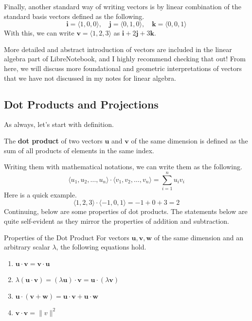 \documentclass[../../main.tex]{subfiles}
\begin{document}
Finally, another standard way of writing vectors is by linear
combination of the standard basis vectors defined as the following.
\[
\mathbf{i} = \langle 1, 0, 0 \rangle, \quad
\mathbf{j} = \langle 0, 1, 0 \rangle, \quad
\mathbf{k} = \langle 0, 0, 1 \rangle
\]
With this, we can write $\mathbf{v} = \langle 1, 2, 3 \rangle$ as
$\mathbf{i} + 2\mathbf{j} + 3\mathbf{k}$.

More detailed and abstract introduction of vectors are included
in the linear algebra part of LibreNotebook, and I highly recommend
checking that out! From here, we will discuss more foundational and
geometric interpretations of vectors that we have not discussed
in my notes for linear algebra.

\subsection{Dot Products and Projections}

As always, let's start with definition.

\begin{definition}{}{}
The \textbf{dot product} of two vectors $\mathbf{u}$ and $\mathbf{v}$
of the same dimension is defined as the sum of all products of
elements in the same index.
\end{definition}

Writing them with mathematical notations, we can write them as the
following.
\[
\langle u_1, u_2, \ldots, u_n \rangle \cdot
    \langle v_1, v_2, \ldots, v_n \rangle
= \sum_{i=1}^n u_i v_i
\]
Here is a quick example.
\[
\langle 1, 2, 3 \rangle \cdot \langle -1, 0, 1 \rangle
= -1 + 0 + 3
= 2
\]
Continuing, below are some properties of dot products. The statements
below are quite self-evident as they mirror the properties of addition
and subtraction.

\begin{theorem}{}{Properties of the Dot Product}
For vectors $\mathbf{u}, \mathbf{v}, \mathbf{w}$ of the same dimension
and an arbitrary scalar $\lambda$, the following equations hold.
\begin{enumerate}
\item $\mathbf{u} \cdot \mathbf{v} = \mathbf{v} \cdot \mathbf{u}$
\item $\lambda (\mathbf{u} \cdot \mathbf{v})
= (\lambda \mathbf{u}) \cdot \mathbf{v}
= \mathbf{u} \cdot (\lambda \mathbf{v})$
\item $\mathbf{u} \cdot (\mathbf{v} + \mathbf{w})
= \mathbf{u} \cdot \mathbf{v} + \mathbf{u} \cdot \mathbf{w}$
\item $\mathbf{v} \cdot \mathbf{v} = \| v \|^2$
\end{enumerate}
\end{theorem}
\end{document}
